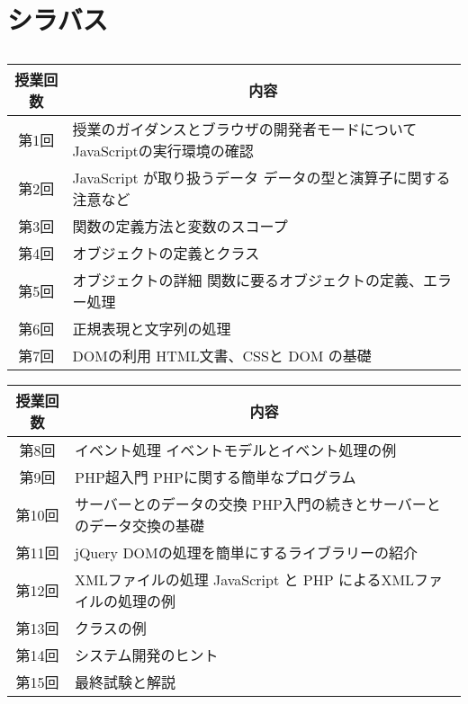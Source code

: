 \section{シラバス}\subsection{}
\begin{frame}
 \begin{center}
\begin{tabular}{|c|m{}|}\hline
 授業回数&\multicolumn{1}{c|}{内容}\\\hline
 第1回&授業のガイダンスとブラウザの開発者モードについて \newline
     JavaScriptの実行環境の確認\\\hline
 第2回&JavaScript が取り扱うデータ\newline
     データの型と演算子に関する注意など\\\hline
 第3回& 関数の定義方法と変数のスコープ\\\hline
 第4回& オブジェクトの定義とクラス\\\hline
 第5回&オブジェクトの詳細\newline
     関数に要るオブジェクトの定義、エラー処理\\\hline
 第6回&正規表現と文字列の処理  \\\hline
 第7回&DOMの利用\newline
     HTML文書、CSSと DOM の基礎\\\hline
\end{tabular}
\end{center}
\end{frame}
\begin{frame}
 \begin{center}
\begin{tabular}{|c|m{}|}\hline
 授業回数&\multicolumn{1}{c|}{内容}\\\hline
 第8回&イベント処理 \newline
     イベントモデルとイベント処理の例\\\hline
 第9回&PHP超入門\newline
       PHPに関する簡単なプログラム\\\hline
 第10回&サーバーとのデータの交換\newline
     PHP入門の続きとサーバーとのデータ交換の基礎\\\hline
 第11回&jQuery \newline
     DOMの処理を簡単にするライブラリーの紹介\\   \hline
 第12回&XMLファイルの処理\newline
     JavaScript と PHP によるXMLファイルの処理の例\\\hline
 第13回&クラスの例\\\hline
 第14回&システム開発のヒント\\\hline
 第15回&最終試験と解説\\ \hline
\end{tabular}
\end{center}
\end{frame}
